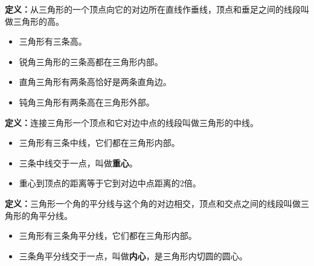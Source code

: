 \documentclass[12pt, a4paper]{ctexart}
\begin{document}
\begin{knowledgebox}[三角形的高]
\textbf{定义：}从三角形的一个顶点向它的对边所在直线作垂线，顶点和垂足之间的线段叫做三角形的高。

\begin{itemize}[nosep]
  \item 三角形有三条高。
  \item 锐角三角形的三条高都在三角形内部。
  \item 直角三角形有两条高恰好是两条直角边。
  \item 钝角三角形有两条高在三角形外部。
\end{itemize}

\begin{center}
\end{center}
\end{knowledgebox}

\begin{knowledgebox}[三角形的中线]
\textbf{定义：}连接三角形一个顶点和它对边中点的线段叫做三角形的中线。

\begin{itemize}[nosep]
  \item 三角形有三条中线，它们都在三角形内部。
  \item 三条中线交于一点，叫做\textbf{重心}。
  \item 重心到顶点的距离等于它到对边中点距离的2倍。
\end{itemize}
\end{knowledgebox}

\begin{knowledgebox}[三角形的角平分线]
\textbf{定义：}三角形一个角的平分线与这个角的对边相交，顶点和交点之间的线段叫做三角形的角平分线。

\begin{itemize}[nosep]
  \item 三角形有三条角平分线，它们都在三角形内部。
  \item 三条角平分线交于一点，叫做\textbf{内心}，是三角形内切圆的圆心。
\end{itemize}
\end{knowledgebox}
\end{document}

